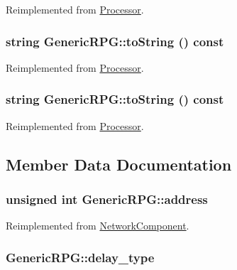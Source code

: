 Reimplemented from \hyperlink{classProcessor_d3bdbedfbb00b05f61504e411a418106}{Processor}.\hypertarget{classGenericRPG_a4303867728559ab6e6ae3d1390ede71}{
\subsubsection[{toString}]{\setlength{\rightskip}{0pt plus 5cm}string GenericRPG::toString () const}}
\label{classGenericRPG_a4303867728559ab6e6ae3d1390ede71}




Reimplemented from \hyperlink{classProcessor_d3bdbedfbb00b05f61504e411a418106}{Processor}.\hypertarget{classGenericRPG_a4303867728559ab6e6ae3d1390ede71}{
\subsubsection[{toString}]{\setlength{\rightskip}{0pt plus 5cm}string GenericRPG::toString () const}}
\label{classGenericRPG_a4303867728559ab6e6ae3d1390ede71}




Reimplemented from \hyperlink{classProcessor_d3bdbedfbb00b05f61504e411a418106}{Processor}.

\subsection{Member Data Documentation}
\hypertarget{classGenericRPG_12a401de0099f5d1e2486886d3a99f0f}{
\subsubsection[{address}]{\setlength{\rightskip}{0pt plus 5cm}unsigned int {\bf GenericRPG::address}}}
\label{classGenericRPG_12a401de0099f5d1e2486886d3a99f0f}




Reimplemented from \hyperlink{classNetworkComponent_0428749bde908497630b506071d52191}{NetworkComponent}.\hypertarget{classGenericRPG_4b27f64374861ba3e2d57451514908f8}{
\subsubsection[{delay\_\-type}]{ {\bf GenericRPG::delay\_\-type}}}
\label{classGenericRPG_4b27f64374861ba3e2d57451514908f8}



